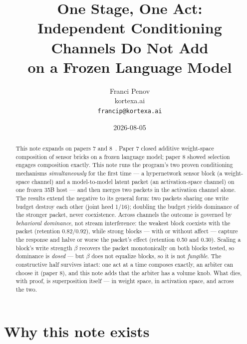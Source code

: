 \documentclass[11pt]{article}
\title{One Stage, One Act:\\Independent Conditioning Channels Do Not Add\\on a Frozen Language Model}
\author{Franci Penov \\ kortexa.ai \\ \texttt{francip@kortexa.ai}}
\date{2026-08-05}
\begin{document}
\maketitle

\begin{abstract}
This note expands on papers 7 and 8~\cite{penov2026interference,penov2026selectable}.
Paper 7 closed additive weight-space composition of sensor bricks on a frozen
language model; paper 8 showed selection engages composition exactly. This
note runs the program's two proven conditioning mechanisms
\emph{simultaneously} for the first time --- a hypernetwork sensor block
(a weight-space channel) and a model-to-model latent packet (an
activation-space channel) on one frozen 35B host --- and then merges two
packets in the activation channel alone. The results extend the negative to
its general form: two packets sharing one write budget destroy each other
(joint heed 1/16);
doubling the budget yields dominance of the stronger packet, never
coexistence. Across channels the outcome is governed by \emph{behavioral
dominance}, not stream interference: the weakest block coexists with the
packet (retention 0.82/0.92),
while strong blocks --- with or without affect --- capture the response and
halve or worse the packet's effect (retention 0.50 and
0.30). Scaling a block's write strength $\beta$ recovers the
packet monotonically on both blocks tested, so dominance is \emph{dosed} ---
but $\beta$ does not equalize blocks, so it is not \emph{fungible}. The
constructive half survives intact: one act at a time composes exactly, an
arbiter can choose it (paper 8), and this note adds that the arbiter has a
volume knob. What dies, with proof, is superposition itself --- in weight
space, in activation space, and across the two.
\end{abstract}

\section{Why this note exists}
\end{document}
